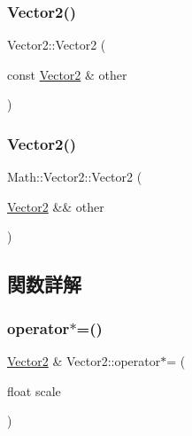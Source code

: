 \subsubsection{\texorpdfstring{Vector2()}{Vector2()}\hspace{0.1cm}{\footnotesize\ttfamily [3/4]}}
{\footnotesize\ttfamily Vector2\+::\+Vector2 (\begin{DoxyParamCaption}\item[{const \mbox{\hyperlink{struct_math_1_1_vector2}{Vector2}} \&}]{other }\end{DoxyParamCaption})}

\mbox{\label{struct_math_1_1_vector2_ac32bb79e657bfbb7553b56a45dfb9ed8}} 
\subsubsection{\texorpdfstring{Vector2()}{Vector2()}\hspace{0.1cm}{\footnotesize\ttfamily [4/4]}}
{\footnotesize\ttfamily Math\+::\+Vector2\+::\+Vector2 (\begin{DoxyParamCaption}\item[{\mbox{\hyperlink{struct_math_1_1_vector2}{Vector2}} \&\&}]{other }\end{DoxyParamCaption})}



\subsection{関数詳解}
\mbox{\label{struct_math_1_1_vector2_a1b94260716b3a0b8552276c46faba5c5}} 
\subsubsection{\texorpdfstring{operator$\ast$=()}{operator*=()}}
{\footnotesize\ttfamily \mbox{\hyperlink{struct_math_1_1_vector2}{Vector2}} \& Vector2\+::operator$\ast$= (\begin{DoxyParamCaption}\item[{float}]{scale }\end{DoxyParamCaption})}

